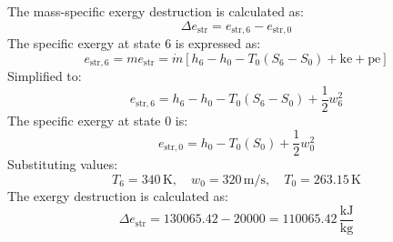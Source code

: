 The mass-specific exergy destruction is calculated as:  
\[
\Delta e_{\text{str}} = e_{\text{str},6} - e_{\text{str},0}
\]  
The specific exergy at state 6 is expressed as:  
\[
e_{\text{str},6} = m e_{\text{str}} = \dot{m} \left[ h_6 - h_0 - T_0 (S_6 - S_0) + \text{ke} + \text{pe} \right]
\]  
Simplified to:  
\[
e_{\text{str},6} = h_6 - h_0 - T_0 (S_6 - S_0) + \frac{1}{2} w_6^2
\]  
The specific exergy at state 0 is:  
\[
e_{\text{str},0} = h_0 - T_0 (S_0) + \frac{1}{2} w_0^2
\]  
Substituting values:  
\[
T_6 = 340 \, \text{K}, \quad w_0 = 320 \, \text{m/s}, \quad T_0 = 263.15 \, \text{K}
\]  
The exergy destruction is calculated as:  
\[
\Delta e_{\text{str}} = 130065.42 - 20000 = 110065.42 \, \frac{\text{kJ}}{\text{kg}}
\]